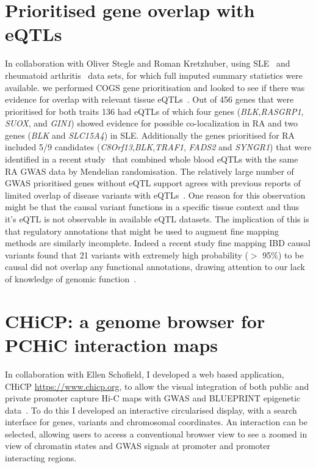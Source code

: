 \documentclass[a4paper,11pt]{report}
\begin{document}
\section{Prioritised gene overlap with eQTLs}
In collaboration with Oliver Stegle and Roman Kretzhuber, using SLE~\citep{Bentham2015-di} and rheumatoid arthritis~\citep{Okada2014-um} data sets, for which full imputed summary statistics were available. we performed COGS gene prioritisation and looked to see if there was evidence for overlap with relevant tissue eQTLs~\citep{FairfaxMakinoRadhakrishnanEtAl2012}.  Out of 456 genes that were prioritised for both traits 136 had eQTLs  of which four genes (\textit{BLK},\textit{RASGRP1}, \textit{SUOX}, and \textit{GIN1}) showed evidence for possible co-localization in RA and two genes (\textit{BLK} and \textit{SLC15A4}) in SLE. Additionally the genes prioritised for RA included 5/9 candidates (\textit{C8Orf13},\textit{BLK},\textit{TRAF1}, \textit{FADS2} and \textit{SYNGR1}) that were identified in a recent study~\citep{ZhuZhangHuEtAl2016} that combined whole blood eQTLs with the same RA GWAS data by Mendelian randomisation. The relatively large number of GWAS prioritised genes without eQTL support  agrees with previous reports of limited overlap of disease variants with eQTLs~\citep{Guo2015-ka,HuangChenEsparzaEtAl2015}. One reason for this observation might be that the causal variant functions in a specific tissue context and thus it's eQTL is not observable in available eQTL datasets. The implication of this is that regulatory annotations that might be used to augment fine mapping methods are similarly incomplete. Indeed a recent study fine mapping IBD causal variants found that 21 variants with extremely high probability ($>$ 95$\%$) to be causal did not overlap any functional annotations, drawing attention to our lack of knowledge of genomic function~\citep{Huang2015-ug}.

\section{CHiCP: a genome browser for PCHiC interaction maps}
In collaboration with Ellen Schofield, I developed a web based application, CHiCP \url{https://www.chicp.org}, to allow the visual integration of both public and private promoter capture Hi-C maps with GWAS and BLUEPRINT epigenetic data~\citep{SchofieldCarverAchuthanEtAl2016}. To do this I developed an interactive circularised display, with a search interface  for genes, variants and chromosomal coordinates. An interaction can be selected, allowing users to access a conventional browser view to see a zoomed in view of chromatin states and GWAS signals at promoter and promoter interacting regions.
\end{document}
